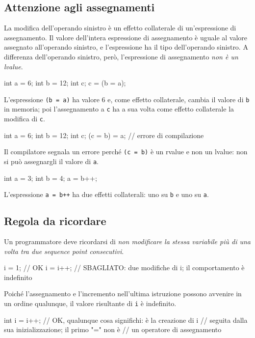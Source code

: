 \documentclass[11pt,a4paper]{article}
\begin{document}
\subsection{Attenzione agli assegnamenti}

La modifica dell'operando sinistro è un effetto collaterale di un'espressione di assegnamento. Il valore dell'intera espressione di assegnamento è uguale al valore assegnato all'operando sinistro, e l'espressione ha il tipo dell'operando sinistro. A differenza dell'operando sinistro, però, l'espressione di assegnamento \emph{non è un lvalue}.

\begin{esempio}
\begin{codice}
int a = 6;
int b = 12;
int c;
c = (b = a);
\end{codice}
L'espressione \lstinline|(b = a)| ha valore $6$ e, come effetto collaterale, cambia il valore di \lstinline|b| in memoria; poi l'assegnamento a \lstinline|c| ha a sua volta come effetto collaterale la modifica di \lstinline|c|.
\end{esempio}

\begin{esempio}
\begin{codice}
int a = 6;
int b = 12;
int c;
(c = b) = a;     // errore di compilazione
\end{codice}
Il compilatore segnala un errore perché \lstinline|(c = b)| è un rvalue e non un lvalue: non si può assegnargli il valore di \lstinline|a|.
\end{esempio}

\begin{esempio}
\begin{codice}
int a = 3;
int b = 4;
a = b++;
\end{codice}
L'espressione \lstinline|a = b++| ha due effetti collaterali: uno su \lstinline|b| e uno su \lstinline|a|.
\end{esempio}

\subsection{Regola da ricordare}

Un programmatore deve ricordarsi di \emph{non modificare la stessa variabile più di una volta tra due sequence point consecutivi}.

\begin{codice}
i = 1;       // OK
i = i++;     // SBAGLIATO: due modifiche di i; il comportamento è indefinito
\end{codice}
Poiché l'assegnamento e l'incremento nell'ultima istruzione possono avvenire in un ordine qualunque, il valore risultante di \lstinline|i| è indefinito.
\begin{codice}
int i = i++;   // OK, qualunque cosa significhi: è la creazione di i
               // seguita dalla sua inizializzazione; il primo "=" non è
               // un operatore di assegnamento
\end{codice}
\end{document}
